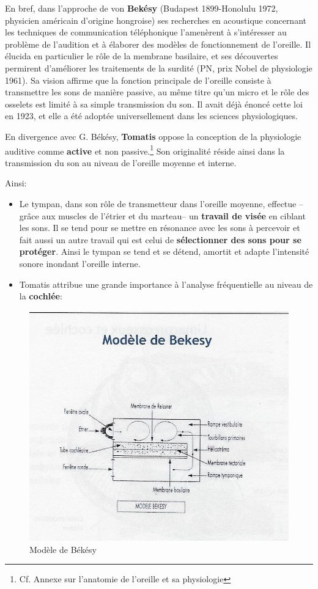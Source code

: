 En bref, dans  l'approche de von\textbf{ Bekésy} (Budapest 1899-Honolulu 1972,
physicien américain d'origine hongroise) ses
recherches en acoustique concernant les techniques de communication
téléphonique l'amenèrent à s'intéresser au problème de l'audition et à
élaborer des modèles de fonctionnement de l'oreille. Il élucida en
particulier le rôle de la membrane basilaire, et ses découvertes
permirent d'améliorer les traitements de la surdité (PN, prix 
Nobel de physiologie 1961).
Sa vision affirme que la fonction principale de l'oreille
consiste à transmettre les sons de manière passive, au même titre qu'un micro et le rôle des osselets 
est limité à sa simple transmission du
son. Il avait déjà énoncé cette loi en 1923, et elle a été adoptée
universellement dans les sciences physiologiques.


En divergence avec G. Békésy, \textbf{Tomatis} oppose la conception de la 
physiologie auditive comme \textbf{active} et non passive.\footnote{Cf. Annexe sur l'anatomie de l'oreille et sa physiologie}
Son originalité réside ainsi dans la transmission du son
au niveau de l'oreille moyenne et interne.

Ainsi: 
\begin{itemize}
	\item Le tympan, dans son rôle de transmetteur dans l'oreille
          moyenne, effectue --grâce aux muscles de l'étrier et du marteau--
		un\textbf{ travail de visée} en ciblant les sons. Il 
se tend
		pour se mettre en résonance avec les sons à percevoir
                et fait aussi un autre travail qui est celui de \textbf{sélectionner des 
sons
		pour se protéger}. Ainsi le tympan se tend et se détend,
              amortit et adapte 
l'intensité
		sonore inondant  l'oreille interne. 

	\item Tomatis attribue une grande importance à l'analyse
          fréquentielle au niveau de la\textbf{ cochlée}: 
\end{itemize}








\begin{figure}
	\centering
	\includegraphics[width=0.7\linewidth]{images/Cochleederoule_bas.jpg}
	\caption[Modèle de Békésy]{Modèle de Békésy}
	\label{fig:cochleederoulebas}
\end{figure}


